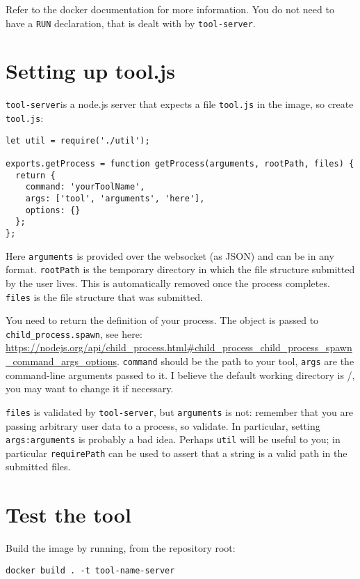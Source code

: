 \documentclass{article}
\newcommand{\ts}{\texttt{tool-server}}
\begin{document}
Refer to the docker documentation for more information. You do not need to have a \texttt{RUN} declaration, that is dealt with by \ts.

\section{Setting up tool.js}
\ts is a node.js server that expects a file \texttt{tool.js} in the image, so create \texttt{tool.js}:

\begin{lstlisting}
let util = require('./util');

exports.getProcess = function getProcess(arguments, rootPath, files) {
  return {
    command: 'yourToolName',
    args: ['tool', 'arguments', 'here'],
    options: {}
  };
};
\end{lstlisting}

Here \texttt{arguments} is provided over the websocket (as JSON) and can be in any format. \texttt{rootPath} is the temporary directory in which the file structure submitted by the user lives. This is automatically removed once the process completes. \texttt{files} is the file structure that was submitted.

You need to return the definition of your process. The object is passed to \texttt{child\_process.spawn}, see here: \url{https://nodejs.org/api/child_process.html\#child_process_child_process_spawn_command_args_options}. \texttt{command} should be the path to your tool, \texttt{args} are the command-line arguments passed to it. I believe the default working directory is /, you may want to change it if necessary.

\texttt{files} is validated by \ts, but \texttt{arguments} is not: remember that you are passing arbitrary user data to a process, so validate. In particular, setting \texttt{args:arguments} is probably a bad idea. Perhaps \texttt{util} will be useful to you; in particular \texttt{requirePath} can be used to assert that a string is a valid path in the submitted files.

\section{Test the tool}
Build the image by running, from the repository root:

\begin{lstlisting}
docker build . -t tool-name-server
\end{lstlisting}
\end{document}
